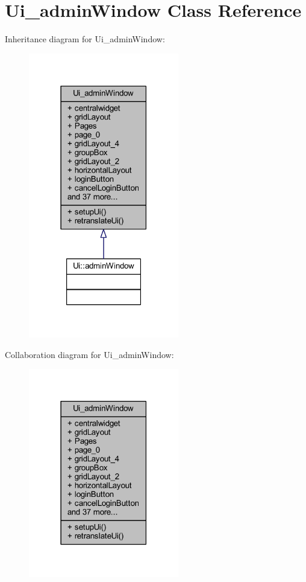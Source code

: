 \hypertarget{class_ui__admin_window}{}\section{Ui\+\_\+admin\+Window Class Reference}
\label{class_ui__admin_window}


Inheritance diagram for Ui\+\_\+admin\+Window\+:
\nopagebreak
\begin{figure}[H]
\begin{center}
\leavevmode
\includegraphics[width=186pt]{class_ui__admin_window__inherit__graph}
\end{center}
\end{figure}


Collaboration diagram for Ui\+\_\+admin\+Window\+:
\nopagebreak
\begin{figure}[H]
\begin{center}
\leavevmode
\includegraphics[width=186pt]{class_ui__admin_window__coll__graph}
\end{center}
\end{figure}
